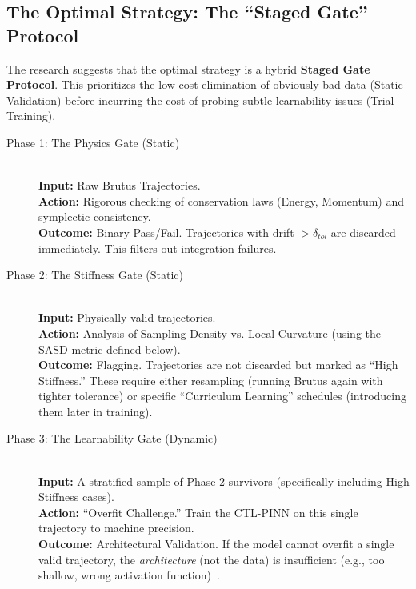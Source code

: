 \documentclass[11pt, a4paper]{article}
\begin{document}
\subsection{The Optimal Strategy: The ``Staged Gate'' Protocol}

The research suggests that the optimal strategy is a hybrid \textbf{Staged Gate Protocol}. This prioritizes the low-cost elimination of obviously bad data (Static Validation) before incurring the cost of probing subtle learnability issues (Trial Training).

\begin{description}
    \item[Phase 1: The Physics Gate (Static)] \hfill \\
    \textbf{Input:} Raw Brutus Trajectories. \\
    \textbf{Action:} Rigorous checking of conservation laws (Energy, Momentum) and symplectic consistency. \\
    \textbf{Outcome:} Binary Pass/Fail. Trajectories with drift $> \delta_{tol}$ are discarded immediately. This filters out integration failures.
    
    \item[Phase 2: The Stiffness Gate (Static)] \hfill \\
    \textbf{Input:} Physically valid trajectories. \\
    \textbf{Action:} Analysis of Sampling Density vs. Local Curvature (using the SASD metric defined below). \\
    \textbf{Outcome:} Flagging. Trajectories are not discarded but marked as ``High Stiffness.'' These require either resampling (running Brutus again with tighter tolerance) or specific ``Curriculum Learning'' schedules (introducing them later in training).
    
    \item[Phase 3: The Learnability Gate (Dynamic)] \hfill \\
    \textbf{Input:} A stratified sample of Phase 2 survivors (specifically including High Stiffness cases). \\
    \textbf{Action:} ``Overfit Challenge.'' Train the CTL-PINN on this single trajectory to machine precision. \\
    \textbf{Outcome:} Architectural Validation. If the model cannot overfit a single valid trajectory, the \textit{architecture} (not the data) is insufficient (e.g., too shallow, wrong activation function)~\cite{ref17}.
\end{description}
\end{document}
